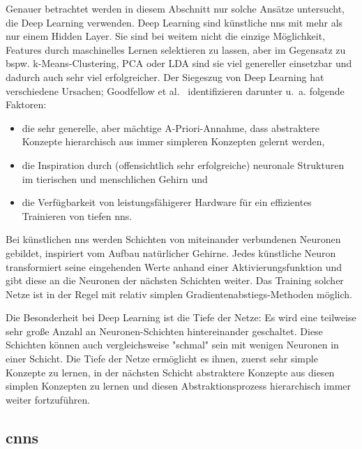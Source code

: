 Genauer betrachtet werden in diesem Abschnitt nur solche Ansätze untersucht, die Deep Learning verwenden.
Deep Learning sind künstliche \glspl{nn} mit mehr als nur einem Hidden Layer.
Sie sind bei weitem nicht die einzige Möglichkeit, Features durch maschinelles Lernen selektieren zu lassen, aber im Gegensatz zu bspw. k-Means-Clustering, PCA oder LDA sind sie viel genereller einsetzbar und dadurch auch sehr viel erfolgreicher.
Der Siegeszug von Deep Learning hat verschiedene Ursachen; Goodfellow et al.~\cite{Goodfellow.2016} identifizieren darunter u.~a. folgende Faktoren:

\begin{itemize}
\setlength{\itemsep}{0pt}
\setlength{\parsep}{0pt}
	\item die sehr generelle, aber mächtige A-Priori-Annahme, dass abstraktere Konzepte hierarchisch aus immer simpleren Konzepten gelernt werden,
	\item die Inspiration durch (offensichtlich sehr erfolgreiche) neuronale Strukturen im tierischen und menschlichen Gehirn und
	\item die Verfügbarkeit von leistungsfähigerer Hardware für ein effizientes Trainieren von tiefen \glspl{nn}.
\end{itemize}

Bei künstlichen \glspl{nn} werden Schichten von miteinander verbundenen Neuronen gebildet, inspiriert vom Aufbau natürlicher Gehirne.
Jedes künstliche Neuron transformiert seine eingehenden Werte anhand einer Aktivierungsfunktion und gibt diese an die Neuronen der nächsten Schichten weiter.
Das Training solcher Netze ist in der Regel mit relativ simplen Gradientenabstiegs-Methoden möglich.

Die Besonderheit bei Deep Learning ist die Tiefe der Netze:
Es wird eine teilweise sehr große Anzahl an Neuronen-Schichten hintereinander geschaltet.
Diese Schichten können auch vergleichsweise "schmal" sein mit wenigen Neuronen in einer Schicht.
Die Tiefe der Netze ermöglicht es ihnen, zuerst sehr simple Konzepte zu lernen, in der nächsten Schicht abstraktere Konzepte aus diesen simplen Konzepten zu lernen und diesen Abstraktionsprozess hierarchisch immer weiter fortzuführen.

\subsection{\glspl{cnn}}


